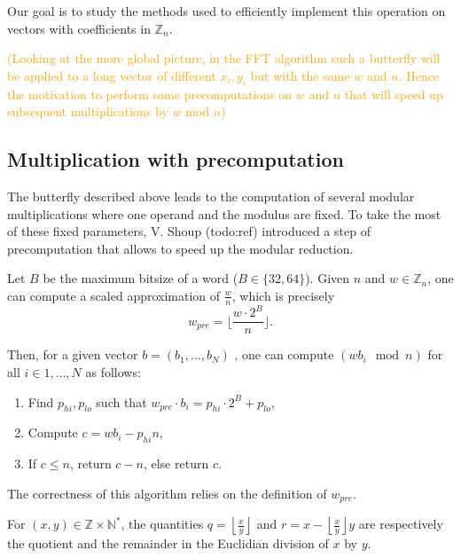 \documentclass[a4paper]{article}
\begin{document}
Our goal is to study the methods used to efficiently implement this operation on vectors with coefficients in $\mathbb{Z}_n$.

\textcolor{orange}{(Looking at the more global picture, in the FFT algorithm such a butterfly will
be applied to a long vector of different \(x_i, y_i\) but with the same \(w\) and \(n\).
Hence the motivation to perform some precomputations on \(w\) and \(n\) that will speed
up subsequent multiplications by \(w\) mod \(n\))}

\subsection{Multiplication with precomputation}

The butterfly described above leads to the computation of several modular multiplications where one operand and the modulus are fixed.
To take the most of these fixed parameters, V. Shoup (todo:ref) introduced a step of precomputation that allows to speed up the modular reduction.

Let $B$ be the maximum bitsize of a word ($B\in \{32, 64\}$). Given $n$ and $w \in \mathbb{Z}_n$, one can compute a scaled approximation 
of $\frac{w}{n}$, which is precisely $$ w_{pre} = \biggl\lfloor\dfrac{w\cdot 2^{B}}{n} \biggr\rfloor.$$

Then, for a given vector $b = (b_1,\dots, b_N)$ , one can compute $(wb_i \mod n)$ for all $i\in{1,\dots, N}$ as follows:

\begin{enumerate}
    \item Find $p_{hi}, p_{lo}$ such that $w_{pre} \cdot b_i = p_{hi}\cdot 2^B + p_{lo}$,
    \item Compute $c = wb_i - p_{hi}n$,
    \item If $c \leq n$, return $c-n$, else return $c$.
\end{enumerate}

The correctness of this algorithm relies on the definition of $w_{pre}$. 

\begin{proposition}\label{prop:quorem}
For $(x,y) \in \mathbb{Z}\times \mathbb{N}^*$, the quantities $q=\left\lfloor\frac{x}{y}\right\rfloor$ and 
$r=x - \left\lfloor\frac{x}{y}\right\rfloor y$ are respectively the quotient and the remainder in the Euclidian division of $x$ by $y$.
\end{proposition}
    
\end{document}
